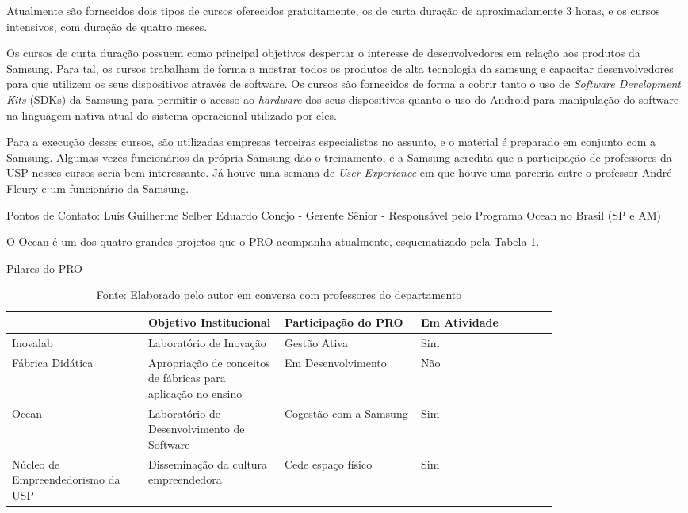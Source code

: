 Atualmente são fornecidos dois tipos de cursos oferecidos gratuitamente, os de curta duração de aproximadamente 3 horas, e os cursos intensivos, com duração de quatro meses. 

Os cursos de curta duração possuem como principal objetivos despertar o interesse de desenvolvedores em relação aos produtos da Samsung. Para tal, os cursos trabalham de forma a mostrar todos os produtos de alta tecnologia da samsung e capacitar desenvolvedores para que utilizem os seus dispositivos através de software. Os cursos são fornecidos de forma a cobrir tanto o uso de \textit{Software Development Kits} (SDKs) da Samsung para permitir o acesso ao \textit{hardware} dos seus dispositivos quanto o uso do Android para manipulação do software na linguagem nativa atual do sistema operacional utilizado por eles.

Para a execução desses cursos, são utilizadas empresas terceiras especialistas no assunto, e o material é preparado em conjunto com a Samsung. Algumas vezes funcionários da própria Samsung dão o treinamento, e a Samsung acredita que a participação de professores da USP nesses cursos seria bem interessante. Já houve uma semana de \textit{User Experience} em que houve uma parceria entre o professor André Fleury e um funcionário da Samsung. 

Pontos de Contato: 
Luís Guilherme Selber
Eduardo Conejo - Gerente Sênior - Responsável pelo Programa Ocean no Brasil (SP e AM)



O Ocean é um dos quatro grandes projetos que o PRO acompanha atualmente, esquematizado pela Tabela \ref{tab:pilares_pro}.

\begin{table}[h]
\begin{center}
\caption{Pilares do PRO}
\label{tab:pilares_pro}
{\def\arraystretch{2}\tabcolsep=10pt
\begin{tabular}{>{\raggedright}p{0.2\linewidth}>{\raggedright\arraybackslash}p{0.2\linewidth}>{\raggedright\arraybackslash}p{0.2\linewidth}>{\raggedright\arraybackslash}p{0.2\linewidth}}
\hline
     & Objetivo Institucional & Participação do PRO & Em Atividade  \\ \hline
     Inovalab & Laboratório de Inovação & Gestão Ativa & Sim  \\
     Fábrica Didática & Apropriação de conceitos de fábricas para aplicação no ensino & Em Desenvolvimento & Não \\
     Ocean & Laboratório de Desenvolvimento de Software & Cogestão com a Samsung & Sim \\
	 Núcleo de Empreendedorismo da USP & Disseminação da cultura empreendedora & Cede espaço físico & Sim \\ \hline
\end{tabular}%
}
\caption* {Fonte: Elaborado pelo autor em conversa com professores do departamento}
\end{center}
\end{table}


